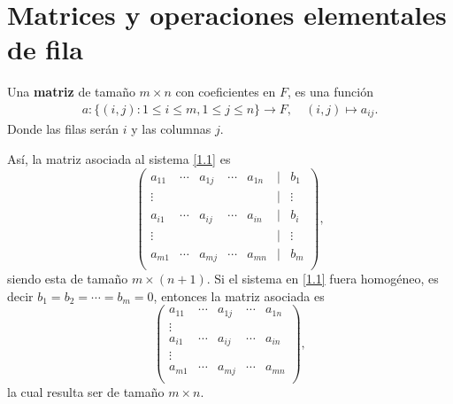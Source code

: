\documentclass[12pt,a4paper]{book}
\newcommand{\llavesgrande}[1]{\big\{#1\big\}}
\begin{document}
    \section{Matrices y operaciones elementales de fila}
    
    \begin{definicion}[Matriz]
    \label{def:4}
        Una \textbf{matriz} de tamaño $m \times n$ con coeficientes en $F$, es una función
        \begin{align*}
            a : \llavesgrande{(i,j): 1 \leq i \leq m, 1 \leq j \leq n} \to F,\quad (i, j) \mapsto a_{ij}.
        \end{align*}
        Donde las filas serán $i$ y las columnas $j$.
    \end{definicion}
    Así, la matriz asociada al sistema \eqref{1.1} es
    \begin{equation*}
        \begin{pmatrix}
            a_{11} & \dotsi & a_{1j} & \dotsi & a_{1n} & | & b_{1}\\[3pt]
            \vdots&&&&&| & \vdots\\[3pt]
            a_{i1} & \dotsi & a_{ij} & \dotsi & a_{in} & | & b_{i}\\[3pt]
            \vdots&&&&&| & \vdots\\[3pt]
            a_{m1} & \dotsi & a_{mj} & \dotsi & a_{mn} & | & b_{m}\\[3pt]
        \end{pmatrix},
    \end{equation*}
    siendo esta de tamaño $m \times (n + 1)$. Si el sistema en \eqref{1.1} fuera homogéneo, es decir $b_{1} = b_{2} = \dotsi = b_{m} = 0$, entonces la matriz asociada es
    \begin{equation*}
        \begin{pmatrix}
            a_{11} & \dotsi & a_{1j} & \dotsi & a_{1n} \\[3pt]
            \vdots&&&&\\[3pt]
            a_{i1} & \dotsi & a_{ij} & \dotsi & a_{in}\\[3pt]
            \vdots&&&&\\[3pt]
            a_{m1} & \dotsi & a_{mj} & \dotsi & a_{mn} \\[3pt]
        \end{pmatrix},
    \end{equation*}
    la cual resulta ser de tamaño $m \times n$.
\end{document}
